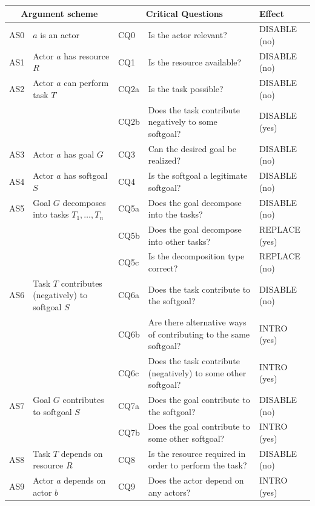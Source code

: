\begin{table}[t]
\centering
\begin{tabularx}{\textwidth}{|l|l|l|X|l|}
\hline
\multicolumn{2}{|c|}{\textbf{Argument scheme}} & \multicolumn{2}{c|}{\textbf{Critical Questions}} & \textbf{Effect}\\
\hline
AS0 & $a$ is an actor & CQ0 & Is the actor relevant? & \textsf{DISABLE} (no)\\
\hline
AS1 & Actor $a$ has resource $R$ & CQ1 &Is the resource available? & \textsf{DISABLE} (no)\\
\hline
AS2 & Actor $a$ can perform task $T$ & CQ2a &Is the task possible? & \textsf{DISABLE} (no)\\
&& CQ2b & Does the task contribute negatively to some softgoal? & \textsf{DISABLE} (yes)\\
\hline
AS3 & Actor $a$ has goal $G$ & CQ3 & Can the desired goal be realized? & \textsf{DISABLE} (no)\\
\hline
AS4 & Actor $a$ has softgoal $S$ & CQ4 & Is the softgoal a legitimate softgoal?& \textsf{DISABLE} (no)\\
\hline
\hline
AS5 & Goal $G$ decomposes into tasks $T_1,\ldots,T_n$ & CQ5a & Does the goal decompose into the tasks?& \textsf{DISABLE} (no)\\
& & CQ5b & Does the goal decompose into other tasks? & \textsf{REPLACE} (yes)\\
 &  & CQ5c & Is the decomposition type correct? & \textsf{REPLACE} (no)\\
\hline
AS6 & Task $T$ contributes (negatively) to softgoal $S$& CQ6a & Does the task contribute to the softgoal?& \textsf{DISABLE} (no)\\
&& CQ6b & Are there alternative ways of contributing to the same softgoal?& \textsf{INTRO} (yes) \\
&& CQ6c & Does the task contribute (negatively) to some other softgoal?& \textsf{INTRO} (yes)\\
\hline
AS7 & Goal $G$ contributes to softgoal $S$ & CQ7a & Does the goal contribute to the softgoal?& \textsf{DISABLE} (no)\\
&& CQ7b & Does the goal contribute to some other softgoal?& \textsf{INTRO} (yes)\\
\hline
AS8 & Task $T$ depends on resource $R$ & CQ8 & Is the resource required in order to perform the task?& \textsf{DISABLE} (no)\\
\hline
AS9 & Actor $a$ depends on actor $b$ & CQ9 & Does the actor depend on any actors?& \textsf{INTRO} (yes)\\

\end{tabularx}
\end{table}
